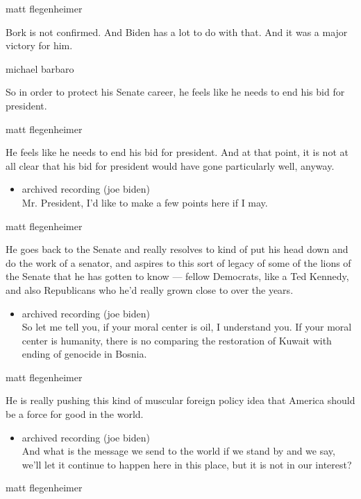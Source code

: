 matt flegenheimer

Bork is not confirmed. And Biden has a lot to do with that. And it was a
major victory for him.

michael barbaro

So in order to protect his Senate career, he feels like he needs to end
his bid for president.

matt flegenheimer

He feels like he needs to end his bid for president. And at that point,
it is not at all clear that his bid for president would have gone
particularly well, anyway.

\begin{itemize}
\tightlist
\item
  archived recording (joe biden)\\
  Mr. President, I'd like to make a few points here if I may.
\end{itemize}

matt flegenheimer

He goes back to the Senate and really resolves to kind of put his head
down and do the work of a senator, and aspires to this sort of legacy of
some of the lions of the Senate that he has gotten to know --- fellow
Democrats, like a Ted Kennedy, and also Republicans who he'd really
grown close to over the years.

\begin{itemize}
\tightlist
\item
  archived recording (joe biden)\\
  So let me tell you, if your moral center is oil, I understand you. If
  your moral center is humanity, there is no comparing the restoration
  of Kuwait with ending of genocide in Bosnia.
\end{itemize}

matt flegenheimer

He is really pushing this kind of muscular foreign policy idea that
America should be a force for good in the world.

\begin{itemize}
\tightlist
\item
  archived recording (joe biden)\\
  And what is the message we send to the world if we stand by and we
  say, we'll let it continue to happen here in this place, but it is not
  in our interest?
\end{itemize}

matt flegenheimer

